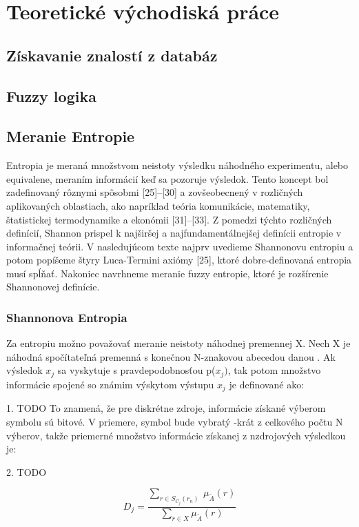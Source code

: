 \chapter{Teoretické východiská práce} 

\section{Získavanie znalostí z databáz }

\section{Fuzzy logika }

\section{Meranie Entropie}
Entropia je meraná množstvom neistoty výsledku náhodného experimentu, alebo equivalene, meraním informácií keď sa pozoruje výsledok. Tento koncept bol zadefinovaný rôznymi spôsobmi [25]–[30] a zovšeobecnený v rozličných aplikovaných oblastiach, ako napríklad teória komunikácie, matematiky, štatistickej termodynamike a ekonómii [31]–[33]. Z pomedzi týchto rozličných definícií, Shannon prispel k najširšej a najfundamentálnejšej definícii entropie v informačnej teórii. V nasledujúcom texte najprv uvedieme Shannonovu entropiu a potom popíšeme štyry Luca-Termini axiómy [25], ktoré dobre-definovaná entropia musí spĺňať. Nakoniec navrhneme meranie fuzzy entropie, ktoré je rozšírenie Shannonovej definície.

\subsection{Shannonova Entropia}
Za entropiu možno považovať meranie neistoty náhodnej premennej X. Nech X je náhodná spočítateľná premenná s konečnou N-znakovou abecedou danou   .
Ak výsledok $x_j$ sa vyskytuje s pravdepodobnosťou p($x_j)$, tak potom množstvo informácie spojené so známim výskytom výstupu $x_j$ je definované ako:

1. TODO
To znamená, že pre diskrétne zdroje, informácie získané výberom symbolu sú bitové. V priemere, symbol  bude vybratý -krát z celkového počtu N výberov, takže priemerné množstvo informácie získanej z nzdrojových výsledkou je:

2. TODO 

\begin{equation}\label{key}
D_j = \frac{ \sum\limits_{r \in S_{C_{j}}(r_n)  } \: \mu_{\tilde{A}} (r) }{\sum\limits_{r \in X  } \mu_{\tilde{A}} (r) }
\end{equation}


